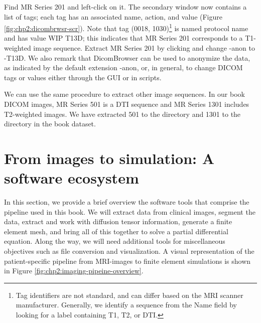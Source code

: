 Find MR Series 201 and left-click on it. The secondary window now
contains a list of tags; each tag has an associated name, action, and
value (Figure \ref{fig:chp2:dicombrwsr-scr}). Note that tag (0018,
1030)\footnote{Tag identifiers are not standard, and can differ based
  on the MRI scanner manufacturer.  Generally, we identify a
  sequence from the Name field by looking for a label containing T1,
  T2, or DTI.} is named protocol name and has value WIP T13D; this
indicates that MR Series 201 corresponds to a T1-weighted image
sequence. Extract MR Series 201 by clicking
 and change -anon to -T13D. We also
remark that DicomBrowser can be used to anonymize the data, as
indicated by the default extension {-anon}, or, in general, to change
DICOM tags or values either through the GUI or in scripts. 

We can use the same procedure to extract other image sequences. In our
book DICOM images, MR Series 501 is a DTI sequence and MR Series 1301
includes T2-weighted images. We have extracted 501 to the directory
 and 1301 to the directory  in the book dataset.


\section{From images to simulation: A software ecosystem}

In this section, we provide a brief overview the software tools that comprise
the pipeline used in this book. We will extract data from clinical
images, segment the data, extract and work with diffusion tensor
information, generate a finite element mesh, and bring all of this
together to solve a partial differential equation. Along
the way, we will need additional tools for miscellaneous
objectives such as file conversion and visualization. A visual
representation of the patient-specific pipeline from MRI-images to
finite element simulations is shown in Figure
\ref{fig:chp2:imaging-pipeine-overview}.

